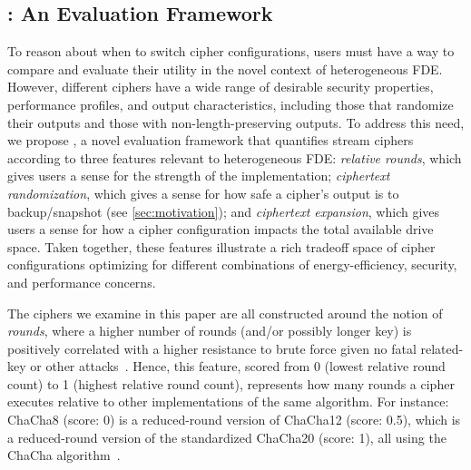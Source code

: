 \subsection{\sysC: An Evaluation Framework}\label{subsec:des-trade}

To reason about when to switch cipher configurations, users must have a way to
compare and evaluate their utility in the novel context of heterogeneous FDE.
However, different ciphers have a wide range of desirable security properties,
performance profiles, and output characteristics, including those that randomize
their outputs and those with non-length-preserving outputs. To address this
need, we propose \sysC, a novel evaluation framework that quantifies stream
ciphers according to three features relevant to heterogeneous FDE: {\em relative
rounds}, which gives users a sense for the strength of the implementation; {\em
ciphertext randomization}, which gives a sense for how safe a cipher's output is
to backup/snapshot (see \cref{sec:motivation}); and {\em ciphertext expansion},
which gives users a sense for how a cipher configuration impacts the total
available drive space. Taken together, these features illustrate a rich tradeoff
space of cipher configurations optimizing for different combinations of
energy-efficiency, security, and performance concerns.


 The ciphers we examine in this paper are all
constructed around the notion of {\em rounds}, where a higher number of rounds
(and/or possibly longer key) is positively correlated with a higher resistance
to brute force given no fatal related-key or other
attacks~\cite{ChaCha-Cryptanalysis}. Hence, this feature, scored from 0 (lowest
relative round count) to 1 (highest relative round count), represents how many
rounds a cipher executes relative to other implementations of the same
algorithm. For instance: ChaCha8 (score: 0) is a reduced-round version of
ChaCha12 (score: 0.5), which is a reduced-round version of the standardized
ChaCha20 (score: 1), all using the ChaCha
algorithm~\cite{ChaCha20,ChaCha-Cryptanalysis}.


